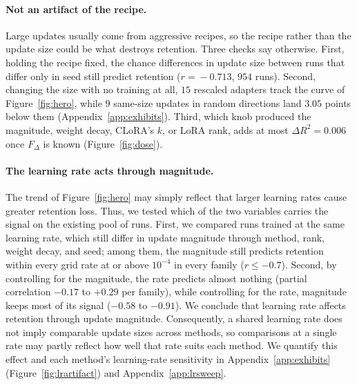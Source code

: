 \documentclass[11pt]{article}
\newcommand{\dw}{F_{\Delta}}
\begin{document}
\paragraph{Not an artifact of the recipe.} Large updates usually come from
aggressive recipes, so the recipe rather than the update size could be what
destroys retention. Three checks say otherwise. First, holding the recipe
fixed, the chance differences in update size between runs that differ only
in seed still predict retention ($r\!=\!-0.713$, $954$ runs). Second,
changing the size with no training at all, $15$ rescaled adapters track the
curve of Figure~\ref{fig:hero}, while $9$ same-size updates in random
directions land $3.05$ points below them (Appendix~\ref{app:exhibits}).
Third, which knob produced the magnitude, weight decay, CLoRA's $k$, or
LoRA rank, adds at most $\Delta R^2 = 0.006$ once $\dw$ is known
(Figure~\ref{fig:dose}).

\paragraph{The learning rate acts through magnitude.} 
The trend of Figure~\ref{fig:hero} may simply reflect that larger learning rates cause greater retention loss. Thus, we tested which of the two variables carries the
signal on the existing pool of runs. First, we
compared runs trained at the same learning rate, which still differ in update magnitude through method, rank, weight decay,  and seed; among them, the magnitude still predicts retention within every grid rate at or above $10^{-4}$ in every family ($r \le -0.7$). Second, by controlling for the magnitude, the rate predicts almost nothing (partial correlation $-0.17$ to $+0.29$ per family), while controlling for the
rate, magnitude keeps most of its signal ($-0.58$ to $-0.91$). We conclude that learning rate affects retention through update magnitude. Consequently, a shared learning rate does not imply comparable update sizes across methods, so comparisons at a single rate may partly reflect how well that rate suits each method. We quantify this effect and each method's learning-rate sensitivity in Appendix~\ref{app:exhibits} (Figure~\ref{fig:lrartifact}) and Appendix~\ref{app:lrsweep}.
\end{document}
